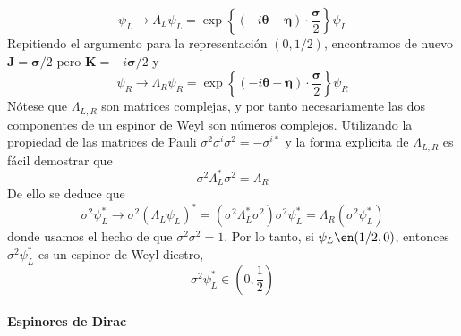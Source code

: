 {                          \begin{equation*}
                            \psi_{L} \rightarrow \Lambda_{L} \psi_{L}=\exp \left\{(-i \boldsymbol{\theta}-\boldsymbol{\eta}) \cdot \frac{\boldsymbol{\sigma}}{2}\right\} \psi_{L} \tag{2.59}
                            \end{equation*}
                            Repitiendo el argumento para la representación $(0,1 / 2)$, encontramos de nuevo $\mathbf{J}=\boldsymbol{\sigma} / 2$ pero $\mathbf{K}=-i \boldsymbol{\sigma} / 2$ y
                            \begin{equation*}
                              \psi_{R} \rightarrow \Lambda_{R} \psi_{R}=\exp \left\{(-i \boldsymbol{\theta}+\boldsymbol{\eta}) \cdot \frac{\boldsymbol{\sigma}}{2}\right\} \psi_{R} \tag{2.60}
                              \end{equation*}
                              Nótese que $\Lambda_{L, R}$ son matrices complejas, y por tanto necesariamente las dos componentes de un espinor de Weyl son números complejos. Utilizando la propiedad de las matrices de Pauli $\sigma^{2} \sigma^{i} \sigma^{2}=-\sigma^{i *}$ y la forma explícita de $\Lambda_{L, R}$ es fácil demostrar que
                              \begin{equation*}
                                \sigma^{2} \Lambda_{L}^{*} \sigma^{2}=\Lambda_{R} \tag{2.61}
                                \end{equation*}
                                De ello se deduce que
                                \begin{equation*}
                                  \sigma^{2} \psi_{L}^{*} \rightarrow \sigma^{2}\left(\Lambda_{L} \psi_{L}\right)^{*}=\left(\sigma^{2} \Lambda_{L}^{*} \sigma^{2}\right) \sigma^{2} \psi_{L}^{*}=\Lambda_{R}\left(\sigma^{2} \psi_{L}^{*}\right) \tag{2.62}
                                  \end{equation*}
                                  donde usamos el hecho de que $\sigma^{2} \sigma^{2}=1$. Por lo tanto, si $\psi_{L} \en(1 / 2,0)$, entonces $\sigma^{2} \psi_{L}^{*}$ es un espinor de Weyl diestro,
                                  \begin{equation*}
                                    \sigma^{2} \psi_{L}^{*} \in\left(0, \frac{1}{2}\right) \tag{2.63}
                                    \end{equation*}
                      \paragraph{Espinores de Dirac}


}
